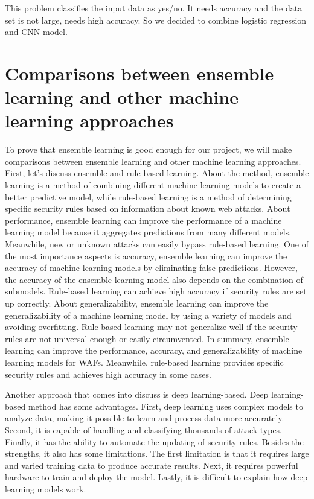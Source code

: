 This problem classifies the input data as yes/no. It needs accuracy and the data set is not large, needs high accuracy. So we decided to combine logistic regression and CNN model.

\section{Comparisons between ensemble learning and other machine learning approaches} 

To prove that ensemble learning is good enough for our project, we will make comparisons between ensemble learning and other machine learning approaches.
First, let's discuss ensemble and rule-based learning. About the method, ensemble learning is a method of combining different machine learning models to create a better predictive model, while rule-based learning is a method of determining specific security rules based on information about known web attacks. About performance, ensemble learning can improve the performance of a machine learning model because it aggregates predictions from many different models. Meanwhile, new or unknown attacks can easily bypass rule-based learning. One of the most importance aspects is accuracy,
ensemble learning can improve the accuracy of machine learning models by eliminating false predictions. However, the accuracy of the ensemble learning model also depends on the combination of submodels. Rule-based learning can achieve high accuracy if security rules are set up correctly.
About generalizability, ensemble learning can improve the generalizability of a machine learning model by using a variety of models and avoiding overfitting. Rule-based learning may not generalize well if the security rules are not universal enough or easily circumvented. In summary, ensemble learning can improve the performance, accuracy, and generalizability of machine learning models for WAFs. Meanwhile, rule-based learning provides specific security rules and achieves high accuracy in some cases.

Another approach that comes into discuss is deep learning-based. Deep learning-based method has some advantages. First, deep learning uses complex models to analyze data, making it possible to learn and process data more accurately. Second, it is capable of handling and classifying thousands of attack types. Finally, it has the ability to automate the updating of security rules. Besides the strengths, it also has some limitations. The first limitation is that it requires large and varied training data to produce accurate results. Next, it requires powerful hardware to train and deploy the model. Lastly, it is difficult to explain how deep learning models work. 

